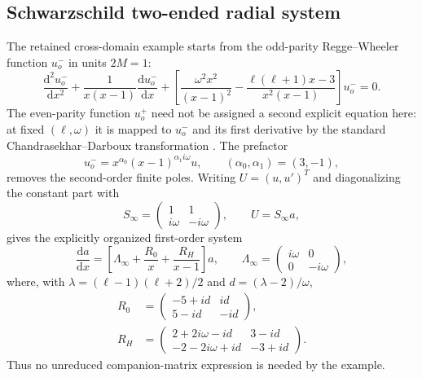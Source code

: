 \documentclass[11pt]{article}
\newcommand{\dd}{\mathrm d}
\begin{document}
\subsection{Schwarzschild two-ended radial system}
\label{subsec:qnm-example}

The retained cross-domain example starts from the odd-parity Regge--Wheeler function
$u^-_o$ in units $2M=1$:
\begin{equation}
 \frac{\dd^2u^-_o}{\dd x^2}
 +\frac{1}{x(x-1)}\frac{\dd u^-_o}{\dd x}
 +\left[\frac{\omega^2x^2}{(x-1)^2}
 -\frac{\ell(\ell+1)x-3}{x^2(x-1)}\right]u^-_o=0.
 \label{eq:qnm-original-rw}
\end{equation}
The even-parity function $u^+_o$ need not be assigned a second explicit equation here: at
fixed $(\ell,\omega)$ it is mapped to $u^-_o$ and its first derivative by the standard
Chandrasekhar--Darboux transformation \cite{Glampedakis:2017rar}.  The prefactor
\begin{equation}
 u^-_o=x^{\alpha_0}(x-1)^{\alpha_1 i\omega}u,
 \qquad (\alpha_0,\alpha_1)=(3,-1),
 \label{eq:qnm-u-transform}
\end{equation}
removes the second-order finite poles.  Writing $U=(u,u')^T$ and diagonalizing the constant
part with
\begin{equation}
 S_\infty=\begin{pmatrix}1&1\\ i\omega&-i\omega\end{pmatrix},
 \qquad U=S_\infty a,
\end{equation}
gives the explicitly organized first-order system
\begin{equation}
 \frac{\dd a}{\dd x}=\left[\Lambda_\infty+
 \frac{R_0}{x}+\frac{R_H}{x-1}\right]a,
 \qquad \Lambda_\infty=\begin{pmatrix}i\omega&0\\0&-i\omega\end{pmatrix},
 \label{eq:qnm-diagonal-system}
\end{equation}
where, with $\lambda=(\ell-1)(\ell+2)/2$ and $d=(\lambda-2)/\omega$,
\begin{align}
 R_0&=\begin{pmatrix}-5+id&id\\5-id&-id\end{pmatrix},\\
 R_H&=\begin{pmatrix}2+2i\omega-id&3-id\\-2-2i\omega+id&-3+id\end{pmatrix}.
 \label{eq:qnm-residue-matrices}
\end{align}
Thus no unreduced companion-matrix expression is needed by the example.
\end{document}
